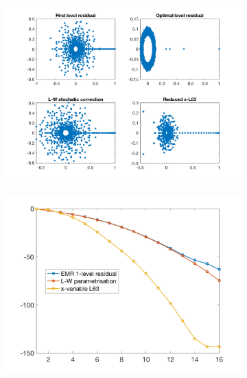 \documentclass[12pt]{article}
\begin{document}
\begin{figure}[H]
	\centering
	\begin{subfigure}[b]{0.32\textwidth}
		\centering
		\includegraphics[width=\textwidth]{plots/l84l63/ergodicity_spectrum_residuals.png}
	\end{subfigure}
	\hfill
	\begin{subfigure}[b]{0.32\textwidth}
		\centering
		\includegraphics[width=\textwidth]{plots/l84l63/ergodicity_rates_residuals.png}
	\end{subfigure}
	\hfill
	\begin{subfigure}[b]{0.32\textwidth}
		\centering

\end{subfigure}
\end{figure}
\end{document}

